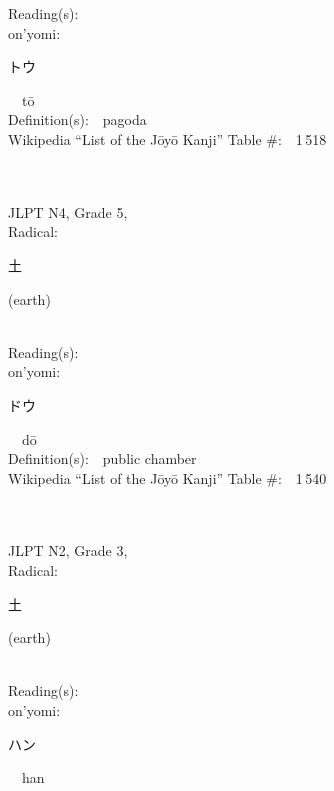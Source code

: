 \begin{multicols}{2}
Reading(s):\ \ \\
{\hspace*{1em}}on'yomi:\ \ \\
{\hspace*{2em}}{\begin{CJK}{UTF8}{min} トウ \end{CJK}}\ \ t\=o\ \ \\
Definition(s):\ \ pagoda \\
Wikipedia ``List of the J\=oy\=o Kanji'' Table \#:\ \ 1\,518 \\
\ \ \\
{\fontsize{34pt}{40pt}  }\ \ \\  %
{JLPT N4, Grade 5, \\Radical:\ \ {\begin{CJK}{UTF8}{min} 土 \end{CJK}} (earth) } \\
Reading(s):\ \ \\
{\hspace*{1em}}on'yomi:\ \ \\
{\hspace*{2em}}{\begin{CJK}{UTF8}{min} ドウ \end{CJK}}\ \ d\=o\ \ \\
Definition(s):\ \ public chamber \\
Wikipedia ``List of the J\=oy\=o Kanji'' Table \#:\ \ 1\,540 \\
\ \ \\
{\fontsize{34pt}{40pt}  }\ \ \\  %
{JLPT N2, Grade 3, \\Radical:\ \ {\begin{CJK}{UTF8}{min} 土 \end{CJK}} (earth) } \\
Reading(s):\ \ \\
{\hspace*{1em}}on'yomi:\ \ \\
{\hspace*{2em}}{\begin{CJK}{UTF8}{min} ハン \end{CJK}}\ \ han\ \ \\

\end{multicols}
